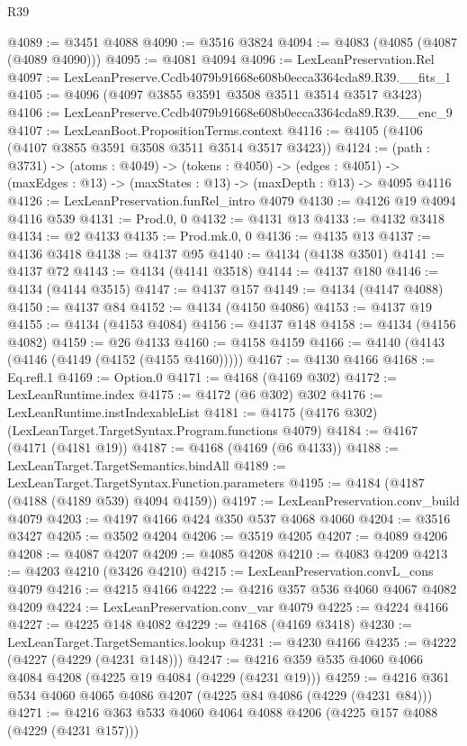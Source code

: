\begin{lexlean}{R39}
\begin{coremodule}
@4089 := @3451 @4088
@4090 := @3516 @3824
@4094 := @4083 (@4085 (@4087 (@4089 @4090)))
@4095 := @4081 @4094
@4096 := LexLeanPreservation.Rel
@4097 := LexLeanPreserve.Ccdb4079b91668e608b0ecca3364cda89.R39.__fits_1
@4105 := @4096 (@4097 @3855 @3591 @3508 @3511 @3514 @3517 @3423)
@4106 := LexLeanPreserve.Ccdb4079b91668e608b0ecca3364cda89.R39.__enc_9
@4107 := LexLeanBoot.PropositionTerms.context
@4116 := @4105 (@4106 (@4107 @3855 @3591 @3508 @3511 @3514 @3517 @3423))
@4124 := (path : @3731) ->
  (atoms : @4049) ->
  (tokens : @4050) ->
  (edges : @4051) -> (maxEdges : @13) -> (maxStates : @13) -> (maxDepth : @13) -> @4095 @4116
@4126 := LexLeanPreservation.funRel_intro @4079
@4130 := @4126 @19 @4094 @4116 @539
@4131 := Prod.{0, 0}
@4132 := @4131 @13
@4133 := @4132 @3418
@4134 := @2 @4133
@4135 := Prod.mk.{0, 0}
@4136 := @4135 @13
@4137 := @4136 @3418
@4138 := @4137 @95
@4140 := @4134 (@4138 @3501)
@4141 := @4137 @72
@4143 := @4134 (@4141 @3518)
@4144 := @4137 @180
@4146 := @4134 (@4144 @3515)
@4147 := @4137 @157
@4149 := @4134 (@4147 @4088)
@4150 := @4137 @84
@4152 := @4134 (@4150 @4086)
@4153 := @4137 @19
@4155 := @4134 (@4153 @4084)
@4156 := @4137 @148
@4158 := @4134 (@4156 @4082)
@4159 := @26 @4133
@4160 := @4158 @4159
@4166 := @4140 (@4143 (@4146 (@4149 (@4152 (@4155 @4160)))))
@4167 := @4130 @4166
@4168 := Eq.refl.{1}
@4169 := Option.{0}
@4171 := @4168 (@4169 @302)
@4172 := LexLeanRuntime.index
@4175 := @4172 (@6 @302) @302
@4176 := LexLeanRuntime.instIndexableList
@4181 := @4175 (@4176 @302) (LexLeanTarget.TargetSyntax.Program.functions @4079)
@4184 := @4167 (@4171 (@4181 @19))
@4187 := @4168 (@4169 (@6 @4133))
@4188 := LexLeanTarget.TargetSemantics.bindAll
@4189 := LexLeanTarget.TargetSyntax.Function.parameters
@4195 := @4184 (@4187 (@4188 (@4189 @539) @4094 @4159))
@4197 := LexLeanPreservation.conv_build @4079
@4203 := @4197 @4166 @424 @350 @537 @4068 @4060
@4204 := @3516 @3427
@4205 := @3502 @4204
@4206 := @3519 @4205
@4207 := @4089 @4206
@4208 := @4087 @4207
@4209 := @4085 @4208
@4210 := @4083 @4209
@4213 := @4203 @4210 (@3426 @4210)
@4215 := LexLeanPreservation.convL_cons @4079
@4216 := @4215 @4166
@4222 := @4216 @357 @536 @4060 @4067 @4082 @4209
@4224 := LexLeanPreservation.conv_var @4079
@4225 := @4224 @4166
@4227 := @4225 @148 @4082
@4229 := @4168 (@4169 @3418)
@4230 := LexLeanTarget.TargetSemantics.lookup
@4231 := @4230 @4166
@4235 := @4222 (@4227 (@4229 (@4231 @148)))
@4247 := @4216 @359 @535 @4060 @4066 @4084 @4208 (@4225 @19 @4084 (@4229 (@4231 @19)))
@4259 := @4216 @361 @534 @4060 @4065 @4086 @4207 (@4225 @84 @4086 (@4229 (@4231 @84)))
@4271 := @4216 @363 @533 @4060 @4064 @4088 @4206 (@4225 @157 @4088 (@4229 (@4231 @157)))

\end{coremodule}
\end{lexlean}
